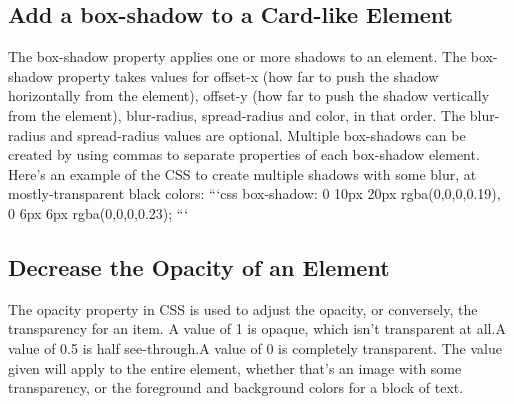 \documentclass{article}%
\begin{document}
\subsection{Add a box{-}shadow to a Card{-}like Element}%
\label{subsec:Addabox{-}shadowtoaCard{-}likeElement}%
The box{-}shadow property applies one or more shadows to an element.\newline%
The box{-}shadow property takes values for\newline%
offset{-}x (how far to push the shadow horizontally from the element),\newline%
offset{-}y (how far to push the shadow vertically from the element),\newline%
blur{-}radius,\newline%
spread{-}radius and\newline%
color, in that order.\newline%
The blur{-}radius and spread{-}radius values are optional.\newline%
Multiple box{-}shadows can be created by using commas to separate properties of each box{-}shadow element.\newline%
Here's an example of the CSS to create multiple shadows with some blur, at mostly{-}transparent black colors:\newline%
```css\newline%
box{-}shadow: 0 10px 20px rgba(0,0,0,0.19), 0 6px 6px rgba(0,0,0,0.23);\newline%
```\newline%

%
\subsection{Decrease the Opacity of an Element}%
\label{subsec:DecreasetheOpacityofanElement}%
The opacity property in CSS is used to adjust the opacity, or conversely, the transparency for an item.\newline%
A value of 1 is opaque, which isn't transparent at all.A value of 0.5 is half see{-}through.A value of 0 is completely transparent.\newline%
The value given will apply to the entire element, whether that's an image with some transparency, or the foreground and background colors for a block of text.\newline%

%
\end{document}
